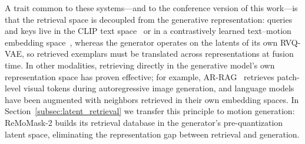 A trait common to these systems---and to the conference version of this work---is that the retrieval space is decoupled from the generative representation: queries and keys live in the CLIP text space~\cite{clip,remodiffuse} or in a contrastively learned text--motion embedding space~\cite{tmr,remogpt}, whereas the generator operates on the latents of its own RVQ-VAE, so retrieved exemplars must be translated across representations at fusion time. In other modalities, retrieving directly in the generative model's own representation space has proven effective; for example, AR-RAG~\cite{qi2025ar} retrieves patch-level visual tokens during autoregressive image generation, and language models have been augmented with neighbors retrieved in their own embedding spaces.
In Section~\ref{subsec:latent_retrieval} we transfer this principle to motion generation: ReMoMask-2 builds its retrieval database in the generator's pre-quantization latent space, eliminating the representation gap between retrieval and generation.


